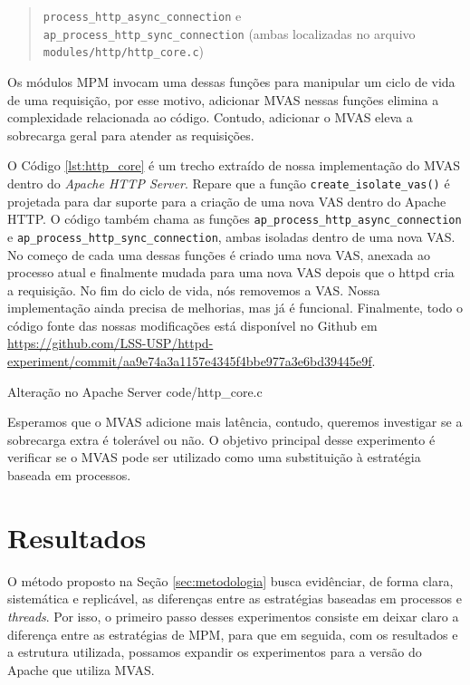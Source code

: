 \begin{quote}
  \texttt{process\_http\_async\_connection} e\\
  \texttt{ap\_process\_http\_sync\_connection} (ambas localizadas no arquivo
  \texttt{modules/http/http\_core.c})
\end{quote}

Os módulos MPM invocam uma dessas funções para manipular um ciclo de vida de
uma requisição, por esse motivo, adicionar MVAS nessas funções elimina a
complexidade relacionada ao código. Contudo, adicionar o MVAS eleva a
sobrecarga geral para atender as requisições.

O Código \ref{lst:http_core} é um trecho extraído de nossa implementação do MVAS
dentro do \emph{Apache HTTP Server}. Repare que a função \texttt{create\_isolate\_vas()} é
projetada para dar suporte para a criação de uma nova VAS dentro do Apache
HTTP. O código também chama as funções
\texttt{ap\_process\_http\_async\_connection} e
\texttt{ap\_process\_http\_sync\_connection}, ambas isoladas dentro de uma nova
VAS. No começo de cada uma dessas funções é criado uma nova VAS, anexada ao
processo atual e finalmente mudada para uma nova VAS depois que o httpd cria a
requisição. No fim do ciclo de vida, nós removemos a VAS. Nossa implementação
ainda precisa de melhorias, mas já é funcional. Finalmente, todo o código fonte
das nossas modificações está disponível no Github em
\url{https://github.com/LSS-USP/httpd-experiment/commit/aa9e74a3a1157e4345f4bbe977a3e6bd39445e9f}.

\begin{ruledcaption}{Alteração no Apache Server\label{lst:http_core}}
 {code/http_core.c}
\end{ruledcaption}

Esperamos que o MVAS adicione mais latência, contudo, queremos
investigar se a sobrecarga extra é tolerável ou não. O objetivo principal desse
experimento é verificar se o MVAS pode ser utilizado como uma substituição à
estratégia baseada em processos.

\section{Resultados}
\label{sec:preliminary}

O método proposto na Seção \ref{sec:metodologia} busca evidênciar, de forma
clara, sistemática e replicável, as diferenças entre as estratégias baseadas em
processos e \emph{threads}. Por isso, o primeiro passo desses experimentos consiste em
deixar claro a diferença entre as estratégias de MPM, para que em seguida, com
os resultados e a estrutura utilizada, possamos expandir os experimentos para a
versão do Apache que utiliza MVAS.

